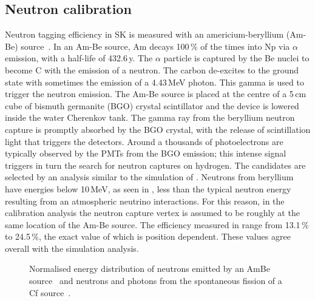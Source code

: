 \subsection{Neutron calibration}


Neutron tagging efficiency in SK is measured with an americium-beryllium (Am-Be) source~\cite{Watanabe:2008ru}.
In an Am-Be source, Am decays 100\,\% of the times into Np via $\alpha$ emission, %
with a half-life of 432.6\,y.
The $\alpha$ particle is captured by the Be nuclei to become C\tapi{*} with the emission of a neutron.
The carbon de-excites to the ground state with sometimes the emission of a 4.43\,MeV photon.
This gamma is used to trigger the neutron emission.
The Am-Be source is placed at the centre of a 5\,cm cube of bismuth germanite (BGO) crystal scintillator and %
the device is lowered inside the water Cherenkov tank.
The gamma ray from the beryllium neutron capture is promptly absorbed by the BGO crystal, %
with the release of scintillation light that triggers the detectors. 
Around a thousands of photoelectrons are typically observed by the PMTs from the BGO emission; %
this intense signal triggers in turn the search for neutron captures on hydrogen.
The candidates are selected by an analysis similar to the simulation of .
Neutrons from beryllium have energies below 10\,MeV, as seen in , %
less than the typical neutron energy resulting from an atmospheric neutrino interactions.
For this reason, in the calibration analysis the neutron capture vertex is assumed to be roughly at the same location %
of the Am-Be source.
The efficiency measured in  range from 13.1\,\% to 24.5\,\%, %
the exact value of which is position dependent.
These values agree overall with the simulation analysis.

\begin{figure}
	\begin{minipage}[t]{0.48\textwidth}
		\centering
		\resizebox{\textwidth}{!}{}
		\caption{Normalised energy distribution of neutrons emitted by an AmBe source~\cite{PMID:4744412} %
			and neutrons and photons from the spontaneous fission of a %
			Cf source~\cite{PhysRev.104.699, PhysRev.108.411}.}
		\label{fig:spectra}
	\end{minipage}
	\hfill
	\begin{minipage}[t]{0.48\textwidth}
		\centering
		\resizebox{\textwidth}{!}{}
		\label{fig:QE}
	\end{minipage}
\end{figure}

